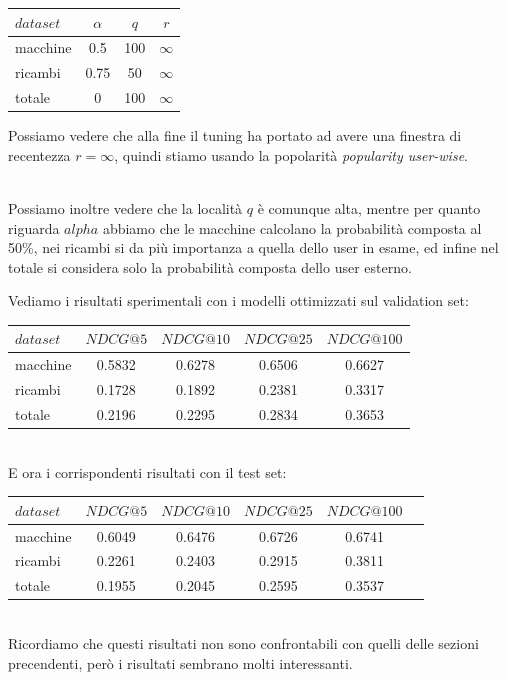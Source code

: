 \begin{minipage}[H]{0.45\textwidth}
    \begin{tabular}{|l|ccc|}
        \toprule
        $dataset$ &    $\alpha$ &  $q$ & $r$ \\
        \midrule
        macchine & 0.5 & 100 & $\infty$ \\
        ricambi  &	0.75 & 50 & $\infty$ \\
        totale  & 0 & 100 & $\infty$ \\
    \bottomrule
    \end{tabular}
\end{minipage}
\begin{minipage}[H]{0.55\textwidth}
    Possiamo vedere che alla fine il tuning ha portato ad avere una finestra di recentezza  $r = \infty$, quindi stiamo usando la popolarità \textit{popularity user-wise}. 
\end{minipage}\\

Possiamo inoltre vedere che la località $q$ è comunque alta, mentre per quanto riguarda $alpha$ abbiamo che le macchine calcolano la probabilità composta al 50\%, nei ricambi si da più importanza a quella dello user in esame, ed infine nel totale si considera solo la probabilità composta dello user esterno.

Vediamo i risultati sperimentali con i modelli ottimizzati sul validation set:\\

\begin{tabular}{|l|cccc|}
    \toprule
    $dataset$  &  $NDCG@5$ & $NDCG@10$  & $NDCG@25$ & $NDCG@100$  \\
    \midrule
    macchine & 0.5832 & 0.6278 & 0.6506 & 0.6627 \\
    ricambi & 0.1728 & 0.1892 & 0.2381 & 0.3317 \\
    totale  & 0.2196 & 0.2295 & 0.2834 & 0.3653 \\
\bottomrule
\end{tabular}\\

E ora i corrispondenti risultati con il test set:\\

\begin{tabular}{|l|ccccc|}
    \toprule
    $dataset$  &  $NDCG@5$ & $NDCG@10$  & $NDCG@25$ & $NDCG@100$  \\
    \midrule
    macchine & 0.6049 & 0.6476 & 0.6726 & 0.6741 \\
    ricambi & 0.2261 & 0.2403 & 0.2915 & 0.3811 \\
    totale  & 0.1955 & 0.2045 & 0.2595 & 0.3537 \\
\bottomrule
\end{tabular}\\

Ricordiamo che questi risultati non sono confrontabili con quelli delle sezioni precendenti, però i risultati sembrano molti interessanti.
